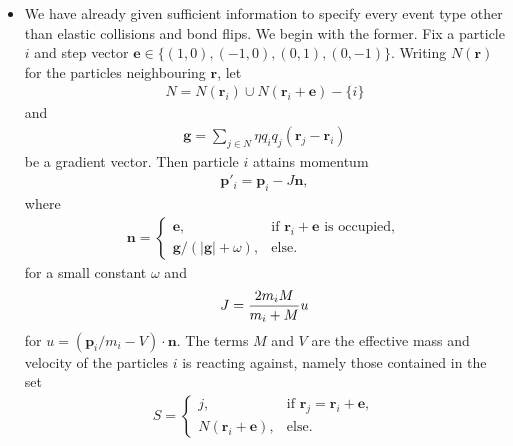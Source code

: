 \documentclass[12pt,letterpaper]{article}
\newcommand{\mb}{\mathbf}
\begin{document}
\begin{itemize}
\begin{align*}
m_{A} = \sum_{a \in A}m_{a},
\end{align*}
where $m_{a}$ is the mass of particle $a$, and the position of $A$ is its center of mass,
\begin{align*}
\mb{r}_{A} = {1 \over m_{A}}\sum_{a \in A}m_{a}\mb{r}_{a}.
\end{align*}
The potential energy and momentum of $A$ are simply determined additively,
\begin{align*}
U(A) &= \sum_{a \in A}U(\mb{r}_{a}; a), \\
\mb{p}_{A} &= \sum_{a \in A}\mb{p}_{a},
\end{align*}
and substitute for the particle equivalents as expected.
\item We have already given sufficient information to specify every event type other than elastic collisions and bond flips. We begin with the former. Fix a particle $i$ and step vector $\mb{e} \in \{(1, 0), (-1, 0), (0, 1), (0, -1)\}$. Writing $N(\mb{r})$ for the particles neighbouring $\mb{r}$, let
\begin{align*}
N = N(\mb{r}_{i}) \cup N(\mb{r}_{i} + \mb{e}) - \{i\}
\end{align*}
and
\begin{align*}
\mb{g} = \sum_{j \in N}\eta q_{i}q_{j}(\mb{r}_{j} - \mb{r}_{i})
\end{align*}
be a gradient vector. Then particle $i$ attains momentum
\begin{align*}
\mb{p}'_{i} = \mb{p}_{i} - J\mb{n},
\end{align*}
where
\begin{align*}
\mb{n} = \begin{cases}
\mb{e}, &\textrm{if } \mb{r}_{i} + \mb{e} \textrm{ is occupied}, \\
\mb{g}/(|\mb{g}| + \omega), &\textrm{else.}
\end{cases}
\end{align*}
for a small constant $\omega$ and
\begin{align*}
J = {2m_{i}M \over m_{i} + M}u
\end{align*}
for $u = \left(\mb{p}_{i}/m_{i} - V\right) \cdot \mb{n}$. The terms $M$ and $V$ are the effective mass and velocity of the particles $i$ is reacting against, namely those contained in the set
\begin{align*}
S = \begin{cases}
j, &\textrm{if } \mb{r}_{j} = \mb{r}_{i} + \mb{e}, \\
N(\mb{r}_{i} + \mb{e}), &\textrm{else.}
\end{cases}

\end{align*}
\end{itemize}
\end{document}
